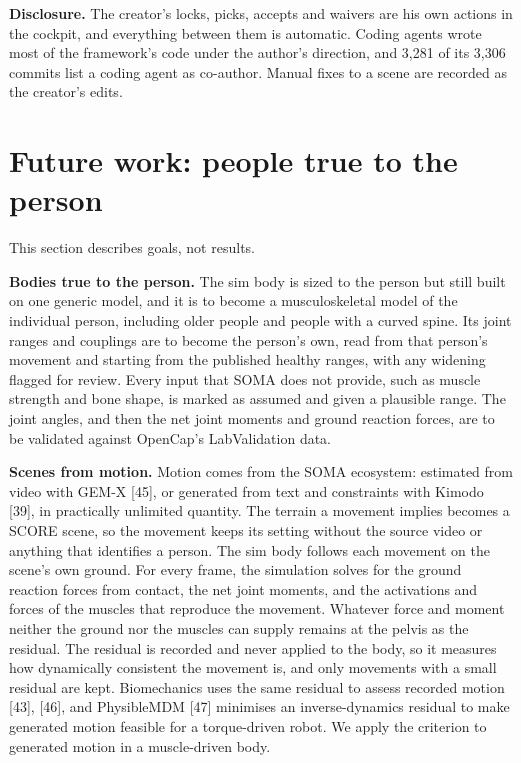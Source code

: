 \documentclass[
  11pt,
]{article}
\begin{document}
\begin{center}\end{center}

\textbf{Disclosure.} The creator's locks, picks, accepts and waivers are
his own actions in the cockpit, and everything between them is
automatic. Coding agents wrote most of the framework's code under the
author's direction, and 3,281 of its 3,306 commits list a coding agent
as co-author. Manual fixes to a scene are recorded as the creator's
edits.

\section{Future work: people true to the
person}\label{future-work-people-true-to-the-person}

This section describes goals, not results.

\textbf{Bodies true to the person.} The sim body is sized to the person
but still built on one generic model, and it is to become a
musculoskeletal model of the individual person, including older people
and people with a curved spine. Its joint ranges and couplings are to
become the person's own, read from that person's movement and starting
from the published healthy ranges, with any widening flagged for review.
Every input that SOMA does not provide, such as muscle strength and bone
shape, is marked as assumed and given a plausible range. The joint
angles, and then the net joint moments and ground reaction forces, are
to be validated against OpenCap's LabValidation data.

\textbf{Scenes from motion.} Motion comes from the SOMA ecosystem:
estimated from video with GEM-X {[}45{]}, or generated from text and
constraints with Kimodo {[}39{]}, in practically unlimited quantity. The
terrain a movement implies becomes a SCORE scene, so the movement keeps
its setting without the source video or anything that identifies a
person. The sim body follows each movement on the scene's own ground.
For every frame, the simulation solves for the ground reaction forces
from contact, the net joint moments, and the activations and forces of
the muscles that reproduce the movement. Whatever force and moment
neither the ground nor the muscles can supply remains at the pelvis as
the residual. The residual is recorded and never applied to the body, so
it measures how dynamically consistent the movement is, and only
movements with a small residual are kept. Biomechanics uses the same
residual to assess recorded motion {[}43{]}, {[}46{]}, and PhysibleMDM
{[}47{]} minimises an inverse-dynamics residual to make generated motion
feasible for a torque-driven robot. We apply the criterion to generated
motion in a muscle-driven body.
\end{document}
